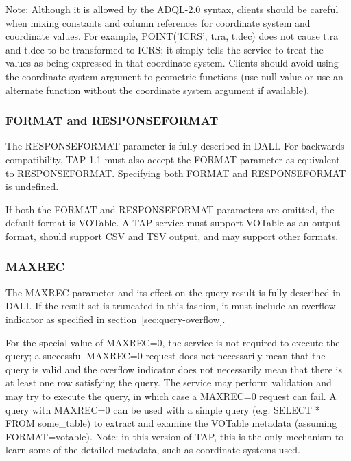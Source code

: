 \documentclass[11pt,letter]{ivoa}
\begin{document}
Note: Although it is allowed by the ADQL-2.0 syntax, clients should be careful when 
mixing constants and column references for coordinate system and coordinate 
values. For example, POINT('ICRS', t.ra, t.dec) does not cause t.ra and t.dec to 
be transformed to ICRS; it simply tells the service to treat the values  as 
being expressed in that coordinate system. Clients should avoid using the coordinate 
system argument to geometric functions (use null value or use an 
alternate function without the coordinate system argument if available).

\subsubsection{FORMAT and RESPONSEFORMAT}
\label{sec:RESPONSEFORMAT}

The RESPONSEFORMAT parameter is fully described in DALI. For 
backwards 
compatibility, TAP-1.1 must also accept the FORMAT parameter as equivalent to 
RESPONSEFORMAT.  
Specifying both FORMAT and RESPONSEFORMAT is undefined.

If both the FORMAT and RESPONSEFORMAT parameters are omitted, the
default format is VOTable.  A TAP service must support VOTable as an
output format, should support CSV and TSV output, and may support other
formats.

\subsubsection{MAXREC}
\label{sec:MAXREC}

The MAXREC parameter and its effect on the query result is fully described in 
DALI. If the result set is truncated in this fashion, it must 
include an overflow indicator as specified in section~\ref{sec:query-overflow}.

For the special value of MAXREC=0, the service is not required to execute the 
query; a successful  MAXREC=0 request does not necessarily mean that the query 
is valid and the overflow indicator does not necessarily mean that there is at 
least one row satisfying the query. The service may perform validation and may 
try to execute the query, in which case a MAXREC=0 request can fail. A query 
with MAXREC=0 can be used with a simple query (e.g. SELECT * FROM  
some\_table) to extract and examine the VOTable metadata (assuming 
FORMAT=votable). Note: in this version of TAP, this is the only mechanism to 
learn some of the detailed metadata, such as coordinate systems used.
\end{document}
